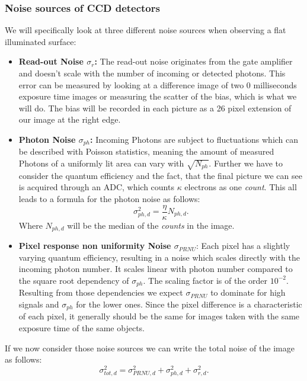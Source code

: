 \subsubsection{Noise sources of CCD detectors}\label{noise}
We will specifically look at three different noise sources when observing a flat illuminated surface:
\begin{itemize}
\item\textbf{Read-out Noise $\sigma_{r}$:}
The read-out noise originates from the gate amplifier and doesn't scale with the number of incoming or detected photons. This error can be measured by looking at a difference image of two 0 milliseconds exposure time images \cite{readout} or measuring the scatter of the bias, which is what we will do. The bias will be recorded in each picture as a 26 pixel extension of our image at the right edge.

\item\textbf{Photon Noise $\sigma_{ph}$:}
Incoming Photons are subject to fluctuations which can be described with Poisson statistics, meaning the amount of measured Photons of a uniformly lit area can vary with $\sqrt{N_{ph}}$. Further we have to consider the quantum efficiency and the fact, that the final picture we can see is acquired through an ADC, which counts $\kappa$ electrons as one \textit{count}. This all leads to a formula for the photon noise as follows:
\begin{equation}\label{sig_phd}
	\sigma_{ph,d}^2 = \dfrac{\eta}{\kappa} N_{ph,d}.
\end{equation}
Where $N_{ph,d}$ will be the median of the \textit{counts} in the image.

\item\textbf{Pixel response non uniformity Noise $\sigma_{PRNU}$}:
Each pixel has a slightly varying quantum efficiency, resulting in a noise which scales directly with the incoming photon number. It scales linear with photon number compared to the square root dependency of $\sigma_{ph}$. The scaling factor is of the order $10^{-2}$. Resulting from those dependencies we expect $\sigma_{PRNU}$ to dominate for high signals and $\sigma_{ph}$ for the lower ones. Since the pixel difference is a characteristic of each pixel, it generally should be the same for images taken with the same exposure time of the same objects.
\end{itemize} 
If we now consider those noise sources we can write the total noise of the image as follows:
\begin{equation}\label{sig_tot}
	\sigma_{tot,d}^2 = \sigma_{PRNU,d}^2 + \sigma_{ph,d}^2 + \sigma_{r,d}^2 .
\end{equation}
